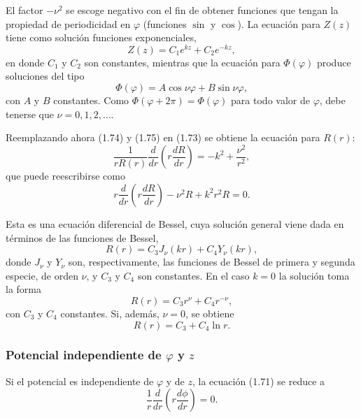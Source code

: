 \documentclass[12pt,a4paper]{book}
\begin{document}
El factor $-\nu^2$ se escoge negativo con el fin de obtener funciones que tengan la propiedad de periodicidad en $\varphi$ (funciones $\sin$ y $\cos$). La ecuación para $Z(z)$ tiene como solución funciones exponenciales,
\begin{equation}
Z(z) = C_1 e^{kz} + C_2 e^{-kz},
\end{equation}
en donde $C_1$ y $C_2$ son constantes, mientras que la ecuación para $\Phi(\varphi)$ produce soluciones del tipo
\begin{equation}
\Phi(\varphi) = A\cos\nu\varphi + B\sin\nu\varphi,
\end{equation}
con $A$ y $B$ constantes. Como $\Phi(\varphi + 2\pi) = \Phi(\varphi)$ para todo valor de $\varphi$, debe tenerse que $\nu = 0, 1, 2, \ldots$.

Reemplazando ahora (1.74) y (1.75) en (1.73) se obtiene la ecuación para $R(r)$:
\begin{equation}
\frac{1}{rR(r)}\frac{d}{dr}\left(r\frac{dR}{dr}\right) = -k^2 + \frac{\nu^2}{r^2},
\end{equation}
que puede reescribirse como
\begin{equation}
r\frac{d}{dr}\left(r\frac{dR}{dr}\right) - \nu^2 R + k^2r^2R = 0.
\end{equation}

Esta es una ecuación diferencial de Bessel, cuya solución general viene dada en términos de las funciones de Bessel,
\begin{equation}
R(r) = C_3 J_{\nu}(kr) + C_4 Y_{\nu}(kr),
\end{equation}
donde $J_{\nu}$ y $Y_{\nu}$ son, respectivamente, las funciones de Bessel de primera y segunda especie, de orden $\nu$, y $C_3$ y $C_4$ son constantes. En el caso $k = 0$ la solución toma la forma
\begin{equation}
R(r) = C_3 r^{\nu} + C_4 r^{-\nu},
\end{equation}
con $C_3$ y $C_4$ constantes. Si, además, $\nu = 0$, se obtiene
\begin{equation}
R(r) = C_3 + C_4 \ln r.
\end{equation}

\subsubsection{Potencial independiente de $\varphi$ y $z$}

Si el potencial es independiente de $\varphi$ y de $z$, la ecuación (1.71) se reduce a
\begin{equation}
\frac{1}{r}\frac{d}{dr}\left(r\frac{d\phi}{dr}\right) = 0.
\end{equation}
\end{document}
